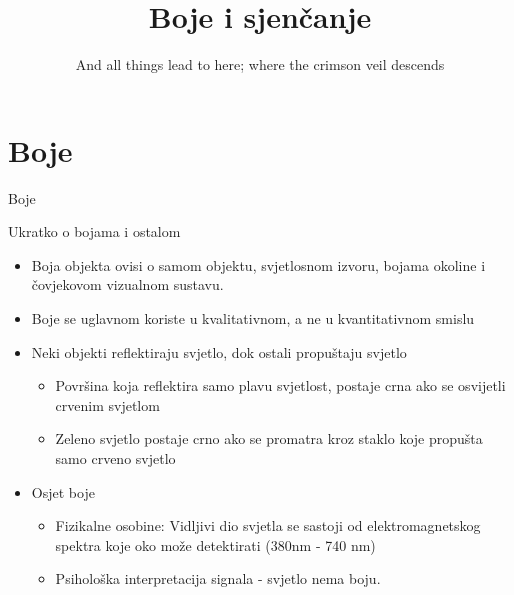\documentclass[9pt]{beamer}
\title{Boje i sjenčanje}
\subtitle {And all things lead to here; where the crimson veil descends}
\institute{Računalna grafika}
\begin{document}
\begin{frame}
 \titlepage
\end{frame}

\section{Boje}
\begin{frame}{Boje}
	\begin{block}{Ukratko o bojama i ostalom}
		\begin{itemize}
			\item Boja objekta ovisi o samom objektu, svjetlosnom izvoru, bojama okoline i čovjekovom vizualnom sustavu. 	
			\item Boje se uglavnom koriste u kvalitativnom, a ne u kvantitativnom smislu
			\item Neki objekti reflektiraju svjetlo, dok ostali propuštaju svjetlo
			\begin{itemize}
				\item Površina koja reflektira samo plavu svjetlost, postaje crna ako se osvijetli crvenim svjetlom
				\item Zeleno svjetlo postaje crno ako se promatra kroz staklo koje propušta samo crveno svjetlo
			\end{itemize}
			\item Osjet boje
			\begin{itemize}
				\item Fizikalne osobine: Vidljivi dio svjetla se sastoji od elektromagnetskog spektra koje oko može detektirati (380nm - 740 nm)
				\item Psihološka interpretacija signala - svjetlo nema boju.
			\end{itemize}
		\end{itemize}
	\end{block}
\end{frame}
\end{document}
